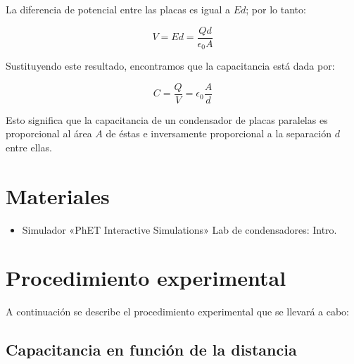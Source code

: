 \documentclass[letter,11pt]{article}
\begin{document}
La diferencia de potencial entre las placas es igual a $E d$; por lo tanto:

\begin{equation}
    V = E d = \frac{Q d}{\epsilon_0 A}
\label{voltaje}
\end{equation}

Sustituyendo este resultado, encontramos que la capacitancia está dada por:

\begin{equation}
    C = \frac{Q}{V} = \epsilon_0 \frac{A}{d}
\label{capacitancia}
\end{equation}

Esto significa que la capacitancia de un condensador de placas paralelas es
proporcional al área $A$ de éstas e inversamente proporcional a la separación
$d$ entre ellas.

\section{Materiales}
\begin{itemize}
\item Simulador «PhET Interactive Simulations» Lab de condensadores: Intro.
\end{itemize}

\section{Procedimiento experimental}
A continuación se describe el procedimiento experimental que se llevará a cabo:

\subsection{Capacitancia en función de la distancia}
\end{document}
